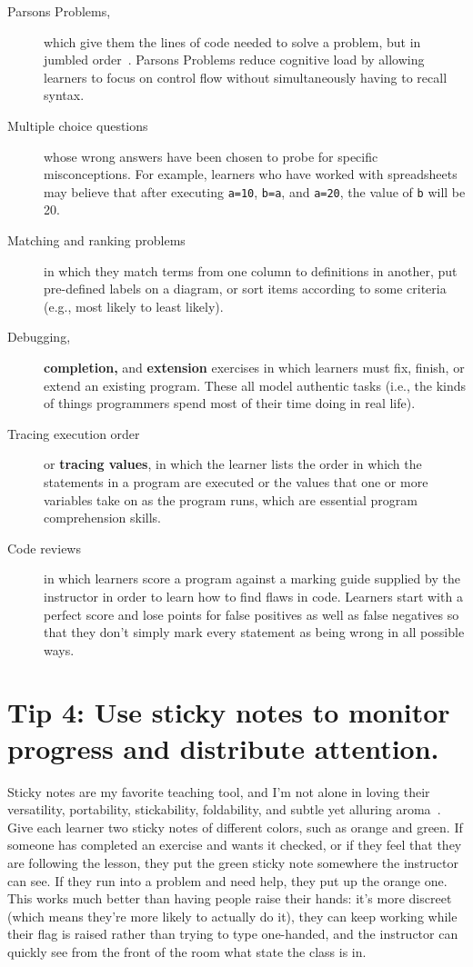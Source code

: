 \documentclass[10pt,letterpaper]{article}
\newcommand{\rulemajor}[1]{\section{#1}}
\begin{document}
\begin{description}

\item[Parsons Problems,]
  which give them the lines of code needed to solve a problem,
  but in jumbled order~\cite{Pars2006,Morr2016,Eric2017}.
  Parsons Problems reduce cognitive load by allowing learners to focus on control flow
  without simultaneously having to recall syntax.

\item[Multiple choice questions]
  whose wrong answers have been chosen to probe for specific misconceptions.
  For example, learners who have worked with spreadsheets may believe that
  after executing \texttt{a=10}, \texttt{b=a}, and \texttt{a=20},
  the value of \texttt{b} will be 20.

\item[Matching and ranking problems]
  in which they match terms from one column to definitions in another,
  put pre-defined labels on a diagram,
  or sort items according to some criteria
  (e.g., most likely to least likely).
  
\item[Debugging,] \textbf{completion,} and \textbf{extension} exercises
  in which learners must fix, finish, or extend an existing program.
  These all model authentic tasks
  (i.e., the kinds of things programmers spend most of their time doing in real life).

\item[Tracing execution order] or \textbf{tracing values},
  in which the learner lists the order in which the statements in a program are executed
  or the values that one or more variables take on as the program runs,
  which are essential program comprehension skills.

\item[Code reviews]
  in which learners score a program against a marking guide supplied by the instructor
  in order to learn how to find flaws in code.
  Learners start with a perfect score and lose points for false positives as well as false negatives
  so that they don't simply mark every statement as being wrong in all possible ways.

\end{description}

\rulemajor{Tip 4: Use sticky notes to monitor progress and distribute attention.}

Sticky notes are my favorite teaching tool,
and I'm not alone in loving their versatility,
portability, stickability, foldability,
and subtle yet alluring aroma~\cite{Ward2015}.
Give each learner two sticky notes of different colors,
such as orange and green.
If someone has completed an exercise and wants it checked,
or if they feel that they are following the lesson,
they put the green sticky note somewhere the instructor can see.
If they run into a problem and need help,
they put up the orange one.
This works much better than having people raise their hands:
it's more discreet (which means they're more likely to actually do it),
they can keep working while their flag is raised rather than trying to type one-handed,
and the instructor can quickly see from the front of the room what state the class is in.
\end{document}
